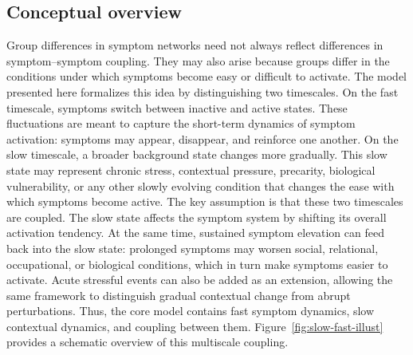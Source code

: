 \documentclass[man,12pt,floatsintext]{apa7}
\begin{document}
\subsection{Conceptual overview}
Group differences in symptom networks need not always reflect differences in symptom--symptom coupling. They may also arise because groups differ in the conditions under which symptoms become easy or difficult to activate. The model presented here formalizes this idea by distinguishing two timescales.
On the fast timescale, symptoms switch between inactive and active states. These fluctuations are meant to capture the short-term dynamics of symptom activation: symptoms may appear, disappear, and reinforce one another. On the slow timescale, a broader background state changes more gradually. This slow state may represent chronic stress, contextual pressure, precarity, biological vulnerability, or any other slowly evolving condition that changes the ease with which symptoms become active.
The key assumption is that these two timescales are coupled. The slow state affects the symptom system by shifting its overall activation tendency. At the same time, sustained symptom elevation can feed back into the slow state: prolonged symptoms may worsen social, relational, occupational, or biological conditions, which in turn make symptoms easier to activate. Acute stressful events can also be added as an extension, allowing the same framework to distinguish gradual contextual change from abrupt perturbations. Thus, the core model contains fast symptom dynamics, slow contextual dynamics, and coupling between them. Figure~\ref{fig:slow-fast-illust} provides a schematic overview of this multiscale coupling.
\end{document}
